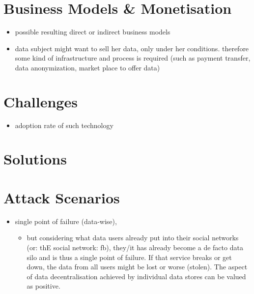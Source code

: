 \documentclass[12pt,english,a4paper,titlepage,cleardoublepage=empty,dottedtoc]{report}
\providecommand{\tightlist}{%
  \setlength{\itemsep}{0pt}\setlength{\parskip}{0pt}}
\begin{document}
\section{Business Models \&
Monetisation}\label{business-models-monetisation}

\begin{itemize}
\tightlist
\item
  possible resulting direct or indirect business models
\item
  data subject might want to sell her data, only under her conditions.
  therefore some kind of infrastructure and process is required (such as
  payment transfer, data anonymization, market place to offer data)
\end{itemize}

\section{Challenges}\label{challenges}

\begin{itemize}
\tightlist
\item
  adoption rate of such technology
\end{itemize}

\section{Solutions}\label{solutions}

\section{Attack Scenarios}\label{attack-scenarios}

\begin{itemize}
\tightlist
\item
  single point of failure (data-wise),

  \begin{itemize}
  \tightlist
  \item
    but considering what data users already put into their social
    networks (or: thE social network: fb), they/it has already become a
    de facto data silo and is thus a single point of failure. If that
    service breaks or get down, the data from all users might be lost or
    worse (stolen). The aspect of data decentralisation achieved by
    individual data stores can be valued as positive.
  \end{itemize}
\end{itemize}
\end{document}

